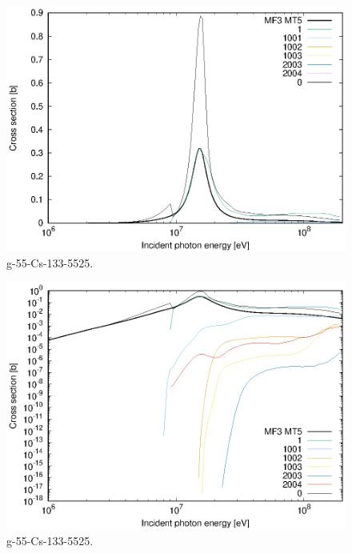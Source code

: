 \begin{figure}
 \includegraphics[width=\linewidth]{eps/g_55-Cs-133_5525.eps}
  \caption{g-55-Cs-133-5525.}
\end{figure}
\begin{figure}
 \includegraphics[width=\linewidth]{eps-log/g_55-Cs-133_5525.eps}
 \caption{g-55-Cs-133-5525.}
\end{figure}
\newpage \clearpage

